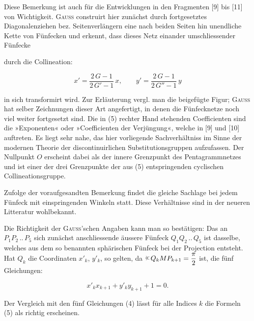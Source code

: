 Diese Bemerkung ist auch für die Entwicklungen in den Fragmenten [9] bis [11] von
Wichtigkeit. \textsc{Gauss} construirt hier zunächst durch fortgesetztes Diagonalenziehen bez.
Seitenverlängern eine nach beiden
Seiten hin unendliche Kette von Fünfecken und erkennt, dass dieses Netz einander umschliessender Fünfecke

\begin{center}\end{center}

durch die Collineation:

\[
x' = \dfrac{2\,G-1}{2\,G'-1}\,x, \qquad y' = \dfrac{2\,G-1}{2\,G''-1}\,y\tag{5}
\]

in sich transformirt wird. Zur Erläuterung vergl. man die beigefügte Figur; \textsc{Gauss} hat selber Zeichnungen dieser Art angefertigt, in denen die Fünfecknetze noch viel weiter fortgesetzt sind. Die in (5) rechter Hand stehenden Coefficienten sind die »Exponenten« oder »Coefficienten der Verjüngung«, welche in [9] und [10] auftreten. Es liegt sehr nahe, das hier vorliegende Sachverhältniss im Sinne der modernen Theorie der discontinuirlichen Substitutionsgruppen aufzufassen. Der Nullpunkt $O$ erscheint dabei als der innere Grenzpunkt des Pentagrammnetzes und ist einer der drei Grenzpunkte der aus (5) entspringenden cyclischen Collineationsgruppe.

Zufolge der voraufgesandten Bemerkung findet die gleiche Sachlage bei jedem Fünfeck mit einspringenden Winkeln statt. Diese Verhältnisse sind in der neueren Litteratur wohlbekannt.

Die Richtigkeit der \textsc{Gauss}'schen Angaben kann man so bestätigen: Das an $P_1P_2\,..\,P_5$ sich zunächst anschliessende äussere Fünfeck $Q_1Q_2\,..\,Q_5$ ist dasselbe, welches aus dem so benannten sphärischen Fünfeck bei der Projection entsteht. Hat $Q_k$ die Coordinaten $x'_k$, $y'_k$, so gelten, da $\HistAngle\,Q_kMP_{k+1} = \dfrac{\pi}{2}$ ist, die fünf Gleichungen:

\[
x'_k x_{k+1} + y'_k y_{k+1} + 1 = 0.
\]

Der Vergleich mit den fünf Gleichungen (4) lässt für alle Indices $k$ die Formeln (5) als richtig erscheinen.

